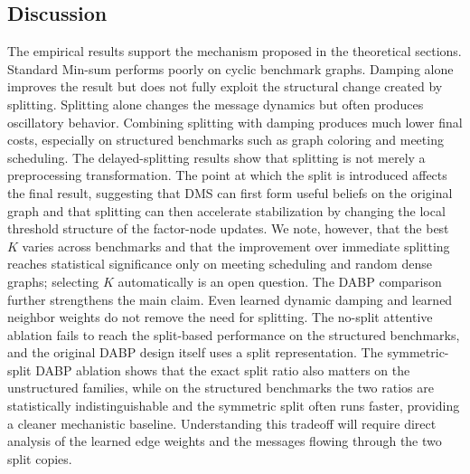 \documentclass[letterpaper]{article} %
\theoremstyle{definition}
\theoremstyle{remark}
\begin{document}
\subsection{Discussion}
The empirical results support the mechanism proposed in the theoretical
sections.  Standard Min-sum performs poorly on cyclic benchmark graphs.
Damping alone improves the result but does not fully exploit the structural
change created by splitting.  Splitting alone changes the message dynamics but
often produces oscillatory behavior.  Combining splitting with damping produces
much lower final costs, especially on structured benchmarks such as graph
coloring and meeting scheduling.
The delayed-splitting results show that splitting is not merely a preprocessing
transformation.  The point at which the split is introduced affects the final
result, suggesting that DMS can first form useful beliefs on the original graph
and that splitting can then accelerate stabilization by changing the local
threshold structure of the factor-node updates.  We note, however, that the
best $K$ varies across benchmarks and that the improvement over immediate
splitting reaches statistical significance only on meeting scheduling and
random dense graphs; selecting $K$ automatically is an open question.
The DABP comparison further strengthens the main claim.  Even learned dynamic
damping and learned neighbor weights do not remove the need for splitting.  The
no-split attentive ablation fails to reach the split-based performance on the
structured benchmarks, and the original DABP design itself uses a split
representation.  The symmetric-split DABP ablation shows that the exact split
ratio also matters on the unstructured families, while on the structured
benchmarks the two ratios are statistically indistinguishable and the symmetric
split often runs faster, providing a cleaner mechanistic baseline.
Understanding this tradeoff will require direct analysis of the learned edge
weights and the messages flowing through the two split copies.
\end{document}
